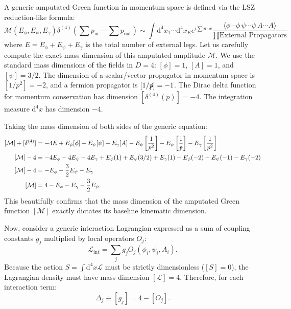 A generic amputated Green function in momentum space is defined via the LSZ reduction-like formula:
\[
    \mathcal{M}(E_\phi, E_\psi, E_\gamma) \delta^{(4)}(\sum p_{\text{in}} - \sum p_{\text{out}}) \sim \int \mathrm{d}^4x_1 \cdots \mathrm{d}^4x_E e^{i\sum p \cdot x} \frac{\langle \phi \cdots \phi \, \psi \cdots \psi \, A \cdots A \rangle}{\prod \text{External Propagators}}
\]
where $E = E_\phi + E_\psi + E_\gamma$ is the total number of external legs.
Let us carefully compute the exact mass dimension of this amputated amplitude $\mathcal{M}$. We use the standard mass dimensions of the fields in $D=4$: $[\phi] = 1$, $[A] = 1$, and $[\psi] = 3/2$. The dimension of a scalar/vector propagator in momentum space is $[1/p^2] = -2$, and a fermion propagator is $[1/\slashed{p}] = -1$. The Dirac delta function for momentum conservation has dimension $[\delta^{(4)}(p)] = -4$. The integration measure $\mathrm{d}^4x$ has dimension $-4$.

Taking the mass dimension of both sides of the generic equation:
\[
    \begin{aligned}
        [\mathcal{M}] + [\delta^{(4)}] & = -4E + E_\phi[\phi] + E_\psi[\psi] + E_\gamma[A] - E_\phi\left[\frac{1}{p^2}\right] - E_\psi\left[\frac{1}{\slashed{p}}\right] - E_\gamma\left[\frac{1}{p^2}\right] \\
        [\mathcal{M}] - 4              & = -4E_\phi - 4E_\psi - 4E_\gamma + E_\phi(1) + E_\psi(3/2) + E_\gamma(1) - E_\phi(-2) - E_\psi(-1) - E_\gamma(-2)                                                    \\
        [\mathcal{M}] - 4              & = -E_\phi - \frac{3}{2}E_\psi - E_\gamma                                                                                                                             \\
        [\mathcal{M}]                  & = 4 - E_\phi - E_\gamma - \frac{3}{2}E_\psi.
    \end{aligned}
\]
This beautifully confirms that the mass dimension of the amputated Green function $[\mathcal{M}]$ exactly dictates its baseline kinematic dimension.

Now, consider a generic interaction Lagrangian expressed as a sum of coupling constants $g_j$ multiplied by local operators $O_j$:
\[
    \mathcal{L}_{\text{int}} = \sum_j g_j O_j(\phi_i, \psi_i, A_i).
\]
Because the action $S = \int \mathrm{d}^4x \mathcal{L}$ must be strictly dimensionless ($[S]=0$), the Lagrangian density must have mass dimension $[\mathcal{L}] = 4$. Therefore, for each interaction term:
\[
    \Delta_j \equiv [g_j] = 4 - [O_j].
\]

